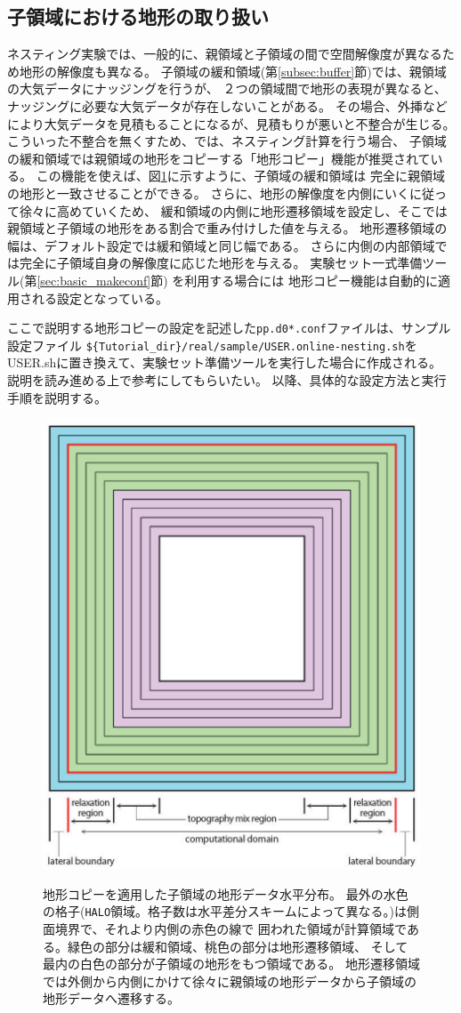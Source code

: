 \subsection{子領域における地形の取り扱い} \label{subsec:nest_topo}
ネスティング実験では、一般的に、親領域と子領域の間で空間解像度が異なるため地形の解像度も異なる。
子領域の緩和領域(第\ref{subsec:buffer}節)では、親領域の大気データにナッジングを行うが、
２つの領域間で地形の表現が異なると、ナッジングに必要な大気データが存在しないことがある。
その場合、外挿などにより大気データを見積もることになるが、見積もりが悪いと不整合が生じる。
%
こういった不整合を無くすため、\scalerm では、ネスティング計算を行う場合、
子領域の緩和領域では親領域の地形をコピーする「地形コピー」機能が推奨されている。
この機能を使えば、図\ref{fig_topocopy}に示すように、子領域の緩和領域は
完全に親領域の地形と一致させることができる。
さらに、地形の解像度を内側にいくに従って徐々に高めていくため、
緩和領域の内側に地形遷移領域を設定し、そこでは親領域と子領域の地形をある割合で重み付けした値を与える。
地形遷移領域の幅は、デフォルト設定では緩和領域と同じ幅である。
さらに内側の内部領域では完全に子領域自身の解像度に応じた地形を与える。
実験セット一式準備ツール(第\ref{sec:basic_makeconf}節) を利用する場合には
地形コピー機能は自動的に適用される設定となっている。


ここで説明する地形コピーの設定を記述した\verb|pp.d0*.conf|ファイルは、サンプル設定ファイル
\verb|${Tutorial_dir}/real/sample/USER.online-nesting.sh|を
USER.shに置き換えて、実験セット準備ツールを実行した場合に作成される。
説明を読み進める上で参考にしてもらいたい。
%
以降、具体的な設定方法と実行手順を説明する。


\begin{figure}[htb]
\begin{center}
  \includegraphics[width=0.4\hsize]{./figure/topo_copy.eps}\\
  \caption{地形コピーを適用した子領域の地形データ水平分布。
最外の水色の格子(\texttt{HALO}領域。格子数は水平差分スキームによって異なる。)は側面境界で、それより内側の赤色の線で
囲われた領域が計算領域である。緑色の部分は緩和領域、桃色の部分は地形遷移領域、
そして最内の白色の部分が子領域の地形をもつ領域である。
地形遷移領域では外側から内側にかけて徐々に親領域の地形データから子領域の地形データへ遷移する。}
  \label{fig_topocopy}
\end{center}
\end{figure}


